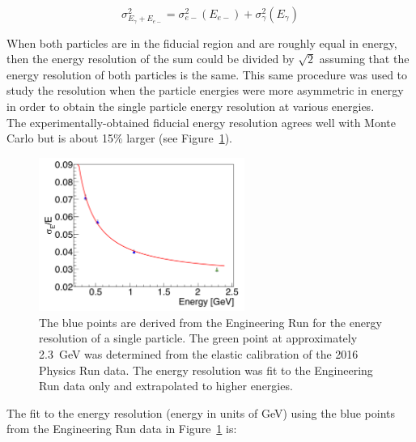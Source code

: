 \begin{equation}
	\label{eq:eResExtract}
	\sigma_{E_{\gamma}+E_{e-}}^2 = \sigma_{e-}^2(E_{e-})+\sigma_{\gamma}^2(E_{\gamma})
\end{equation}

When both particles are in the fiducial region and are roughly equal in energy, then the energy resolution of the sum could be divided by $\sqrt{2}$ assuming that the energy resolution of both particles is the same. This same procedure was used to study the resolution when the particle energies were more asymmetric in energy in order to obtain the single particle energy resolution at various energies. \\
\indent The experimentally-obtained fiducial energy resolution agrees well with Monte Carlo but is about 15$\%$ larger (see Figure~\ref{Figure:eResData}).

\begin{figure}[htb]
  \centering
      \includegraphics[width=0.6\textwidth]{pics/performance/eResData.png}
  \caption[Energy resolution of the ECal found in data]{The blue points are derived from the Engineering Run for the energy resolution of a single particle. The green point at approximately 2.3~GeV was determined from the elastic calibration of the 2016 Physics Run data. The energy resolution was fit to the Engineering Run data only and extrapolated to higher energies.}
  \label{Figure:eResData}
\end{figure}

The fit to the energy resolution (energy in units of GeV) using the blue points from the Engineering Run data in Figure~\ref{Figure:eResData} is:\\

